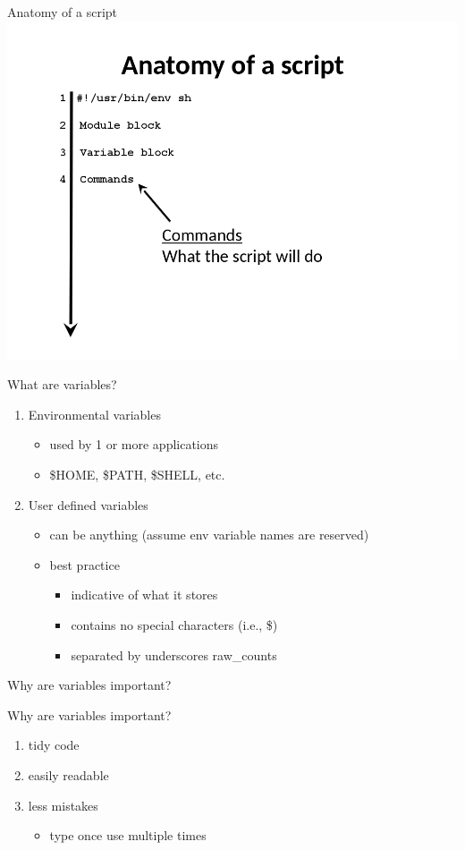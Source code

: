 \documentclass[t,10pt]{beamer}
\begin{document}
\begin{frame}[label={sec:orgheadline10}]{Anatomy of a script}
\includegraphics[width=.9\linewidth]{figures/5_anatomy_shell_script.png}
\end{frame}
\begin{frame}[label={sec:orgheadline11}]{What are variables?}
\begin{enumerate}[<+->]
\item Environmental variables
\begin{itemize}
\item used by 1 or more applications
\item \$HOME, \$PATH, \$SHELL, etc.
\end{itemize}
\item User defined variables
\begin{itemize}
\item can be anything (assume env variable names are \alert{reserved})
\item best practice
\begin{itemize}
\item indicative of what it stores
\item contains no special characters (i.e., \$)
\item separated by underscores raw\_counts
\end{itemize}
\end{itemize}
\end{enumerate}
\end{frame}
\begin{frame}[label={sec:orgheadline12}]{Why are variables important?}
\end{frame}
\begin{frame}[label={sec:orgheadline13}]{Why are variables important?}
\begin{enumerate}[<+->]
\item tidy code
\item easily readable
\item less mistakes
\begin{itemize}
\item type once use multiple times
\end{itemize}
\end{enumerate}
\end{frame}
\end{document}
